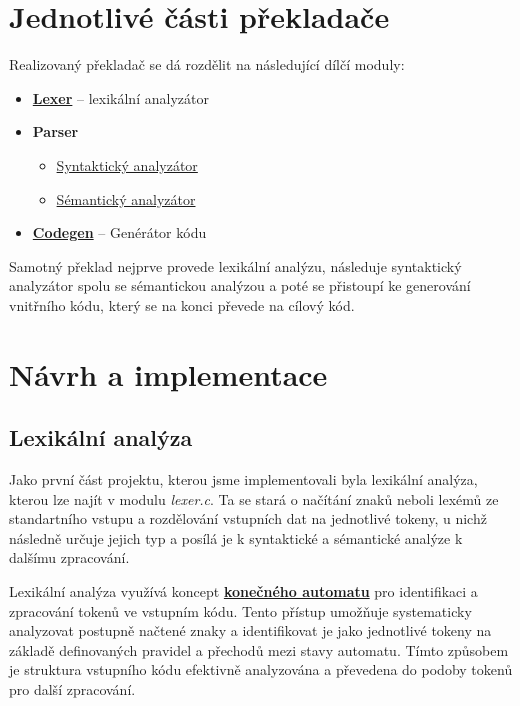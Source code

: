 \documentclass[a4paper, 12pt]{article} %
\begin{document}
    \section{Jednotlivé části překladače}
    Realizovaný překladač se dá rozdělit na následující dílčí moduly:
    \begin{itemize}[noitemsep]
        \item \hyperref[lexer]{\textbf{Lexer}} -- lexikální analyzátor
        \item \textbf{Parser}
            \begin{itemize}
                \item \hyperref[syntactics]{Syntaktický analyzátor}
                \item \hyperref[semantics]{Sémantický analyzátor}
            \end{itemize}
        \item \hyperref[codegen]{\textbf{Codegen}} -- Genérátor kódu
    \end{itemize}
    Samotný překlad nejprve provede lexikální analýzu, následuje syntaktický
    analyzátor spolu se sémantickou analýzou a poté se přistoupí ke generování
    vnitřního kódu, který se na konci převede na cílový kód.

    \section{Návrh a implementace}\label{lexer}
        \subsection{Lexikální analýza}
            Jako první část projektu, kterou jsme implementovali byla lexikální analýza, kterou
            lze najít v modulu \textit{lexer.c}. Ta se
            stará o načítání znaků neboli lexémů ze standartního vstupu a rozdělování vstupních dat na
            jednotlivé tokeny, u nichž následně určuje jejich typ a posílá
            je k syntaktické a sémantické analýze k
            dalšímu zpracování.

            Lexikální analýza využívá koncept \hyperref[kodiagram]{\textbf{konečného automatu}} pro
            identifikaci a zpracování tokenů ve vstupním kódu. Tento přístup umožňuje systematicky
            analyzovat postupně načtené znaky a identifikovat je jako jednotlivé tokeny na základě
            definovaných pravidel a přechodů mezi stavy automatu. Tímto způsobem je struktura
            vstupního kódu efektivně analyzována a převedena do podoby tokenů pro další zpracování.
\end{document}
